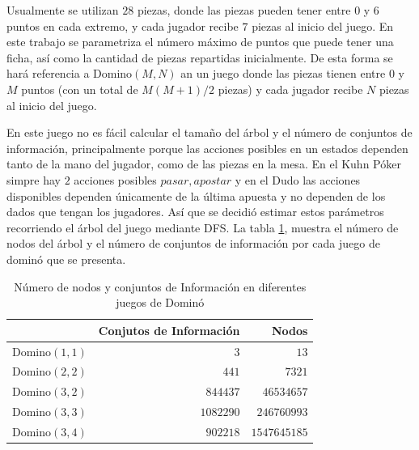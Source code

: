 Usualmente se utilizan $28$ piezas, donde las piezas pueden tener entre $0$ y $6$ puntos en cada extremo, y cada jugador recibe $7$ piezas al inicio del juego. En este trabajo se parametriza el número máximo de puntos que puede tener una ficha, así como la cantidad de piezas repartidas inicialmente. De esta forma se hará referencia a Domino$(M, N)$ an un juego donde las piezas tienen entre $0$ y $M$ puntos (con un total de $M(M+1)/2$ piezas) y cada jugador recibe $N$ piezas al inicio del juego.

En este juego no es fácil calcular el tamaño del árbol y el número de conjuntos de información, principalmente porque las acciones posibles en un estados dependen tanto de la mano del jugador, como de las piezas en la mesa. En el Kuhn Póker simpre hay $2$ acciones posibles ${pasar, apostar}$ y en el Dudo las acciones disponibles dependen únicamente de la última apuesta y no dependen de los dados que tengan los jugadores. Así que se decidió estimar estos parámetros recorriendo el árbol del juego mediante DFS. La tabla \ref{tab:tree-domino}, muestra el número de nodos del árbol y el número de conjuntos de información por cada juego de dominó que se presenta.

\begin{table}[ht]
    \centering
    \begin{tabular}{c|r|r}
        & Conjutos de Información & Nodos \\ \hline
       Domino$(1, 1)$ & $3$ & $13$ \\
       Domino$(2, 2)$ & $441$   & $7321$ \\
       Domino$(3, 2)$ & $844437$   & $46534657$ \\
       Domino$(3, 3)$ & $1082290$   & $246760993$ \\ 
       Domino$(3, 4)$ & $902218$   & $1547645185$ \\ \hline
    \end{tabular}
    \caption{Número de nodos y conjuntos de Información en diferentes juegos de Dominó}
    \label{tab:tree-domino}
\end{table}


